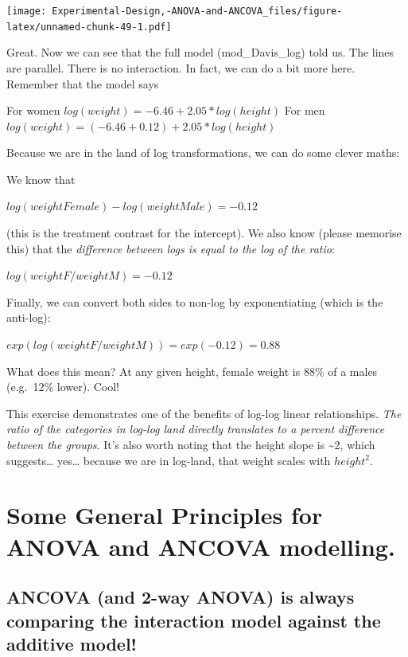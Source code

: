 \documentclass[
]{book}
\begin{document}
\texttt{[image: Experimental-Design,-ANOVA-and-ANCOVA\_files/figure-latex/unnamed-chunk-49-1.pdf]}

Great. Now we can see that the full model (mod\_Davis\_log) told us. The lines are parallel. There is no interaction. In fact, we can do a bit more here. Remember that the model says

For women \(log(weight)= -6.46 + 2.05 * log(height)\)
For men \(log(weight)= (-6.46 + 0.12) + 2.05 * log(height)\)

Because we are in the land of log transformations, we can do some clever maths:

We know that

\(log(weight Female) - log(weight Male) = - 0.12\)

(this is the treatment contrast for the intercept). We also know (please memorise this) that the \emph{difference between logs is equal to the log of the ratio}:

\(log(weightF/weightM) = -0.12\)

Finally, we can convert both sides to non-log by exponentiating (which is the anti-log):

\(exp(log(weightF/weightM)) = exp(-0.12) = 0.88\)

What does this mean? At any given height, female weight is 88\% of a males (e.g.~12\% lower). Cool!

This exercise demonstrates one of the benefits of log-log linear relationships. \emph{The ratio of the categories in log-log land directly translates to a percent difference between the groups}. It's also worth noting that the height slope is \textasciitilde2, which suggests\ldots{} yes\ldots{} because we are in log-land, that weight scales with \(height^2\).

\hypertarget{some-general-principles-for-anova-and-ancova-modelling.}{%
\section{Some General Principles for ANOVA and ANCOVA modelling.}\label{some-general-principles-for-anova-and-ancova-modelling.}}

\hypertarget{ancova-and-2-way-anova-is-always-comparing-the-interaction-model-against-the-additive-model}{%
\subsection{ANCOVA (and 2-way ANOVA) is always comparing the interaction model against the additive model!}\label{ancova-and-2-way-anova-is-always-comparing-the-interaction-model-against-the-additive-model}}
\end{document}
